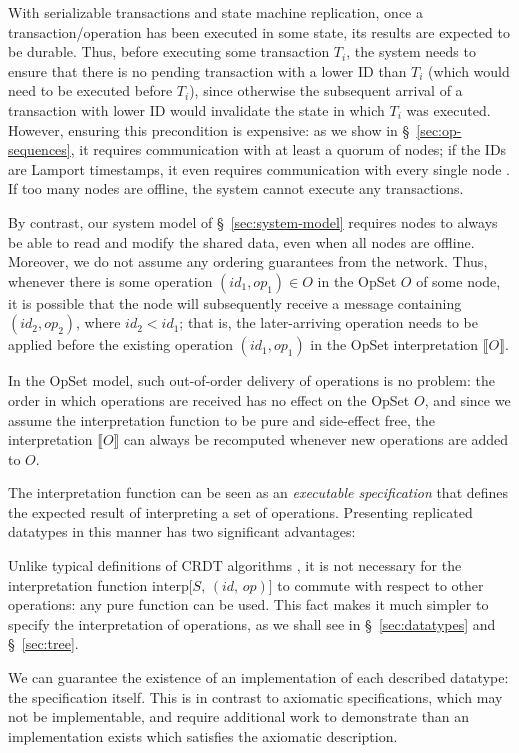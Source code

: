 With serializable transactions and state machine replication, once a transaction/operation has been executed in some state, its results are expected to be durable.
Thus, before executing some transaction $T_i$, the system needs to ensure that there is no pending transaction with a lower ID than $T_i$ (which would need to be executed before $T_i$), since otherwise the subsequent arrival of a transaction with lower ID would invalidate the state in which $T_i$ was executed.
However, ensuring this precondition is expensive: as we show in \S~\ref{sec:op-sequences}, it requires communication with at least a quorum of nodes; if the IDs are Lamport timestamps, it even requires communication with every single node \cite{Lamport:1978jq}.
If too many nodes are offline, the system cannot execute any transactions.

By contrast, our system model of \S~\ref{sec:system-model} requires nodes to always be able to read and modify the shared data, even when all nodes are offline.
Moreover, we do not assume any ordering guarantees from the network.
Thus, whenever there is some operation $(\mathit{id}_1, \mathit{op}_1) \in O$ in the OpSet $O$ of some node, it is possible that the node will subsequently receive a message containing $(\mathit{id}_2, \mathit{op}_2)$, where $\mathit{id}_2 < \mathit{id}_1$; that is, the later-arriving operation needs to be applied before the existing operation $(\mathit{id}_1, \mathit{op}_1)$ in the OpSet interpretation $\llbracket O \rrbracket$.

In the OpSet model, such out-of-order delivery of operations is no problem: the order in which operations are received has no effect on the OpSet $O$, and since we assume the interpretation function to be pure and side-effect free, the interpretation $\llbracket O \rrbracket$ can always be recomputed whenever new operations are added to $O$.

The interpretation function can be seen as an \emph{executable specification} that defines the expected result of interpreting a set of operations.
Presenting replicated datatypes in this manner has two significant advantages:
\begin{enumerate*}
\item
Unlike typical definitions of CRDT algorithms \cite{Shapiro:2011wy,Shapiro:2011un}, it is not necessary for the interpretation function $\mathrm{interp}\big[S,\, (\mathit{id},\, \mathit{op})\big]$ to commute with respect to other operations: any pure function can be used.
This fact makes it much simpler to specify the interpretation of operations, as we shall see in \S~\ref{sec:datatypes} and \S~\ref{sec:tree}.
\item
We can guarantee the existence of an implementation of each described datatype: the specification itself.
This is in contrast to axiomatic specifications, which may not be implementable, and require additional work to demonstrate than an implementation exists which satisfies the axiomatic description.
\end{enumerate*}

